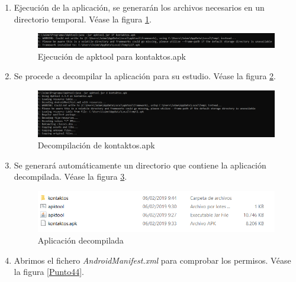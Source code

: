 \documentclass[a4paper,11pt,oneside]{book}
\begin{document}
\begin{enumerate}
\item Ejecución de la aplicación, se generarán los archivos necesarios en un directorio temporal. Véase la figura \ref{Punto41}.

\begin{figure}[h]
\centering
\includegraphics[width=\textwidth]{Punto41}
\caption{Ejecución de apktool para kontaktos.apk}
\label{Punto41}
\end{figure}

\item Se procede a decompilar la aplicación para su estudio. Véase la figura \ref{Punto42}.

\begin{figure}[h]
\centering
\includegraphics[width=\textwidth]{Punto42}
\caption{Decompilación de kontaktos.apk}
\label{Punto42}
\end{figure}

\item Se generará automáticamente un directorio que contiene la aplicación decompilada. Véase la figura \ref{Punto43}.

\begin{figure}[h]
\centering
\includegraphics[width=\textwidth]{Punto43}
\caption{Aplicación decompilada}
\label{Punto43}
\end{figure}

\item Abrimos el fichero \emph{AndroidManifest.xml} para comprobar los permisos. Véase la figura \ref{Punto44}.


\end{enumerate}
\end{document}
